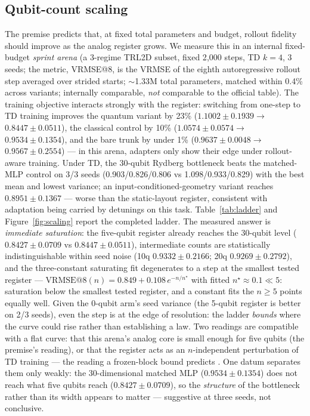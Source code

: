 \documentclass{article}
\makeatletter
\newcommand{\QLzero}{$0.9567 \pm 0.2554$}    %
\newcommand{\QLfive}{$0.8427 \pm 0.0709$}     %
\newcommand{\QLten}{$0.9332 \pm 0.2166$}      %
\newcommand{\QLtwenty}{$0.9269 \pm 0.2792$}   %
\newcommand{\QLthirty}{$0.8447 \pm 0.0511$}  %
\newcommand{\QLmlp}{$0.9534 \pm 0.1354$}     %
\newcommand{\QLgeo}{$0.8951 \pm 0.1367$}     %
\newcommand{\ScalingEq}{$\mathrm{VRMSE@8}(n) = 0.849 + 0.108\, e^{-n/n^\star}$
with fitted $n^\star \approx 0.1 \ll 5$: saturation below the smallest tested
register, and a constant fits the $n \ge 5$ points equally well}
\makeatother
\begin{document}
\subsection{Qubit-count scaling}
\label{sec:scaling}

The premise predicts that, at fixed total parameters and budget, rollout
fidelity should improve as the analog register grows. We measure this in an
internal fixed-budget \emph{sprint arena} (a 3-regime TRL2D subset, fixed
2{,}000 steps, TD $k{=}4$, 3 seeds; the metric, VRMSE@8, is the VRMSE of
the eighth autoregressive rollout step averaged over strided starts;
$\sim$1.33M total parameters, matched within
0.4\% across variants; internally comparable, \emph{not} comparable to the
official table). The training objective interacts strongly with the
register: switching from one-step to TD training improves the quantum
variant by 23\% ($1.1002 \pm 0.1939 \to$ \QLthirty), the classical
control by 10\% ($1.0574 \pm 0.0574 \to$ \QLmlp), and the bare trunk by
under 1\% ($0.9637 \pm 0.0048 \to$ \QLzero) --- in this arena, adapters
only show their edge under rollout-aware training. Under TD, the 30-qubit
Rydberg bottleneck beats the matched-MLP control on 3/3 seeds
(0.903/0.826/0.806 vs 1.098/0.933/0.829) with the best mean and lowest
variance; an input-conditioned-geometry variant reaches \QLgeo{} ---
worse than the static-layout register, consistent with adaptation being
carried by detunings on this task.
Table~\ref{tab:ladder} and Figure~\ref{fig:scaling} report the completed
ladder. The measured answer is \emph{immediate saturation}: the five-qubit
register already reaches the 30-qubit level (\QLfive{} vs \QLthirty),
intermediate counts are statistically indistinguishable within seed noise
(10q \QLten; 20q \QLtwenty), and the three-constant saturating fit
degenerates to a step at the smallest tested register --- \ScalingEq.
Given the 0-qubit arm's seed variance (the 5-qubit register is better on
2/3 seeds), even the step is at the edge of resolution: the ladder
\emph{bounds} where the curve could rise rather than establishing a law.
Two readings are compatible with a flat curve: that this arena's analog
core is small enough for five qubits (the premise's reading), or that the register acts as an $n$-independent perturbation of TD
training --- the reading a frozen-block bound predicts \citep{qi2026lego}. One datum
separates them only weakly: the 30-dimensional matched MLP
(\QLmlp) does not reach what five qubits reach (\QLfive), so the
\emph{structure} of the bottleneck rather than its width appears to
matter --- suggestive at three seeds, not conclusive.
\end{document}
